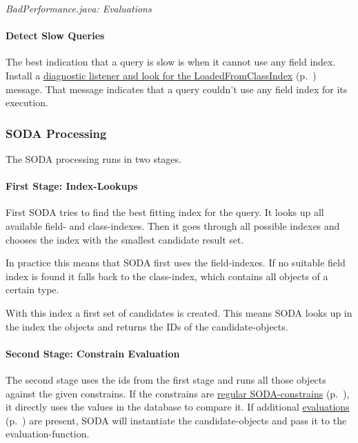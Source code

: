 {\small\itshape BadPerformance.java: Evaluations\par}
\medskip

\paragraph{Detect Slow Queries}
\label{ref:basics-querying-soda-soda-performance-characteristics:detectslowqueries}

The best indication that a query is slow is when it cannot use any field index. Install a \hyperref[ref:advanced-topics-diagnostics]{diagnostic listener and look for the LoadedFromClassIndex} (p.~\pageref{ref:advanced-topics-diagnostics}) message. That message indicates that a query couldn't use any field index for its execution.

\subsubsection{SODA Processing}
\label{ref:basics-querying-soda-soda-processing}

The SODA processing runs in two stages.

\paragraph*{First Stage: Index-Lookups}

First SODA tries to find the best fitting index for the query. It looks up all available field- and class-indexes. Then it goes through all possible indexes and chooses the index with the smallest candidate result set.

In practice this means that SODA first uses the field-indexes. If no suitable field index is found it falls back to the class-index, which contains all objects of a certain type.

With this index a first set of candidates is created. This means SODA looks up in the index the objects and returns the IDs of the candidate-objects.

\paragraph*{Second Stage: Constrain Evaluation}

The second stage uses the ids from the first stage and runs all those objects against the given constrains. If the constrains are \hyperref[ref:basics-querying-soda-soda-example-catelog]{regular SODA-constrains} (p.~\pageref{ref:basics-querying-soda-soda-example-catelog}), it directly uses the values in the database to compare it. If additional \hyperref[ref:basics-querying-soda-soda-evaluations]{evaluations} (p.~\pageref{ref:basics-querying-soda-soda-evaluations}) are present, SODA will instantiate the candidate-objects and pass it to the evaluation-function.

